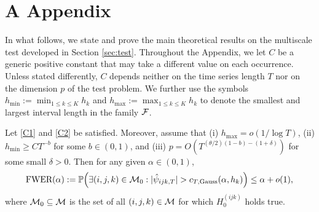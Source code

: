 \documentclass[a4paper,12pt]{article}
\numberwithin{equation}{section}
\begin{document}


\newpage



\section*{A \hspace{0.2cm} Appendix}
\def\theequation{A.\arabic{equation}}
\setcounter{equation}{0}

\enlargethispage{0.1cm}


In what follows, we state and prove the main theoretical results on the multiscale test developed in Section \ref{sec:test}. Throughout the Appendix, we let $C$ be a generic positive constant that may take a different value on each occurrence. Unless stated differently, $C$ depends neither on the time series length $T$ nor on the dimension $p$ of the test problem. We further use the symbols $h_{\min}:= \min_{1 \le k \le K} h_k$ and $h_{\max} := \max_{1 \le k \le K} h_k$ to denote the smallest and largest interval length in the family $\mathcal{F}$. 


\begin{theoremA}\label{theo1}
Let \ref{C1} and \ref{C2} be satisfied. Moreover, assume that (i) $h_{\max} = o(1/\log T)$, (ii) $h_{\min} \ge CT^{-b}$ for some $b \in (0,1)$, and (iii) $p = O(T^{(\theta/2)(1-b)-(1+\delta)})$ for some small $\delta > 0$. Then for any given $\alpha \in (0,1)$,
\[ \textnormal{FWER}(\alpha) := \mathbb{P} \Big( \exists (i,j,k) \in \mathcal{M}_0: |\hat{\psi}_{ijk,T}| > c_{T,\textnormal{Gauss}}(\alpha,h_k) \Big) \le \alpha + o(1), \]
where $\mathcal{M}_0 \subseteq \mathcal{M}$ is the set of all $(i,j,k) \in \mathcal{M}$ for which $H_0^{(ijk)}$ holds true. 
\end{theoremA}
\end{document}
